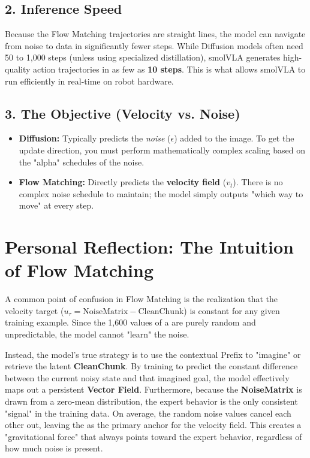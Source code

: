 \documentclass[11pt,a4paper]{article}
\begin{document}
\subsection{2. Inference Speed}
Because the Flow Matching trajectories are straight lines, the model can navigate from noise to data in significantly fewer steps. While Diffusion models often need 50 to 1,000 steps (unless using specialized distillation), smolVLA generates high-quality action trajectories in as few as \textbf{10 steps}. This is what allows smolVLA to run efficiently in real-time on robot hardware.

\subsection{3. The Objective (Velocity vs. Noise)}
\begin{itemize}
    \item \textbf{Diffusion:} Typically predicts the \textit{noise} ($\epsilon$) added to the image. To get the update direction, you must perform mathematically complex scaling based on the "alpha" schedules of the noise.
    \item \textbf{Flow Matching:} Directly predicts the \textbf{velocity field} ($v_t$). There is no complex noise schedule to maintain; the model simply outputs "which way to move" at every step.
\end{itemize}

\section{Personal Reflection: The Intuition of Flow Matching}
A common point of confusion in Flow Matching is the realization that the velocity target ($u_\tau = \text{NoiseMatrix} - \text{CleanChunk}$) is constant for any given training example. Since the 1,600 values of a  are purely random and unpredictable, the model cannot "learn" the noise. 

Instead, the model's true strategy is to use the contextual Prefix to "imagine" or retrieve the latent \textbf{CleanChunk}. By training to predict the constant difference between the current noisy state and that imagined goal, the model effectively maps out a persistent \textbf{Vector Field}. Furthermore, because the \textbf{NoiseMatrix} is drawn from a zero-mean distribution, the expert behavior is the only consistent "signal" in the training data. On average, the random noise values cancel each other out, leaving the  as the primary anchor for the velocity field. This creates a "gravitational force" that always points toward the expert behavior, regardless of how much noise is present.
\end{document}
